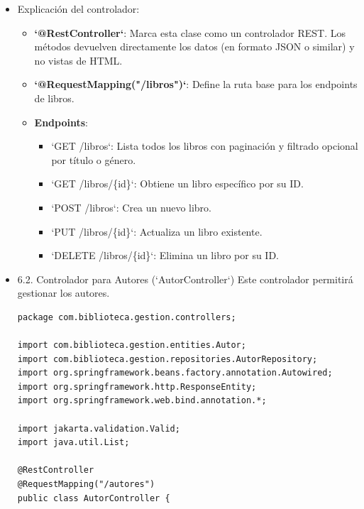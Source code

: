 \documentclass[11pt]{article}
\begin{document}
\begin{itemize}
\begin{verbatim}
    // Eliminar un libro
    @DeleteMapping("/{id}")
    public ResponseEntity<Void> eliminarLibro(@PathVariable Long id) {
        return libroRepository.findById(id)
                .map(libro -> {
                    libroRepository.delete(libro);
                    return ResponseEntity.noContent().build();
                })
                .orElse(ResponseEntity.notFound().build());
    }
}
\end{verbatim}

\item Explicación del controlador:
\label{sec:orgda450c6}
\begin{itemize}
\item \textbf{\textbf{`@RestController`}}: Marca esta clase como un controlador REST. Los métodos devuelven directamente los datos (en formato JSON o similar) y no vistas de HTML.
\item \textbf{\textbf{`@RequestMapping("/libros")`}}: Define la ruta base para los endpoints de libros.
\item \textbf{\textbf{Endpoints}}:
\begin{itemize}
\item `GET /libros`: Lista todos los libros con paginación y filtrado opcional por título o género.
\item `GET /libros/\{id\}`: Obtiene un libro específico por su ID.
\item `POST /libros`: Crea un nuevo libro.
\item `PUT /libros/\{id\}`: Actualiza un libro existente.
\item `DELETE /libros/\{id\}`: Elimina un libro por su ID.
\end{itemize}
\end{itemize}

\item 6.2. Controlador para Autores (`AutorController`)
\label{sec:org0d2ebc0}
Este controlador permitirá gestionar los autores.

\begin{verbatim}
package com.biblioteca.gestion.controllers;

import com.biblioteca.gestion.entities.Autor;
import com.biblioteca.gestion.repositories.AutorRepository;
import org.springframework.beans.factory.annotation.Autowired;
import org.springframework.http.ResponseEntity;
import org.springframework.web.bind.annotation.*;

import jakarta.validation.Valid;
import java.util.List;

@RestController
@RequestMapping("/autores")
public class AutorController {


\end{verbatim}
\end{itemize}
\end{document}
